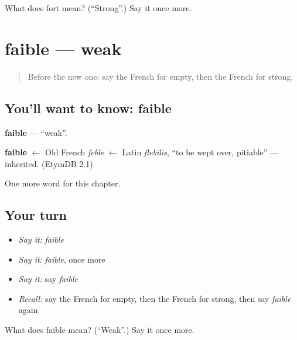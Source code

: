 \begin{tcolorbox}[breakable,colback=teal!4,colframe=teal!35!black,title={Before you move on}]
What does fort mean? (\textquotedblleft{}Strong\textquotedblright{}.) Say it once more.
\end{tcolorbox}
\section[faible]{faible — weak}

\label{lesson:FR-C91-faible}



\begin{quote}
Before the new one: say the French for empty, then the French for strong.
\end{quote}

\subsection*{You'll want to know: faible}
\textbf{faible} — \textquotedblleft{}weak\textquotedblright{}.

\begin{cousinweb}
\textbf{faible} $\leftarrow$ Old French \emph{feble} $\leftarrow$ Latin \emph{flebilis}, \textquotedblleft{}to be wept over, pitiable\textquotedblright{} — inherited. (EtymDB 2.1)
\end{cousinweb}

\begin{grammarlens}[title={What you've built}]
One more word for this chapter.
\end{grammarlens}

\subsection*{Your turn}
\begin{itemize}
\raggedright
  \item \emph{Say it:} \emph{faible}
  \item \emph{Say it:} \emph{faible}, once more
  \item \emph{Say it:} say \emph{faible}
  \item \emph{Recall:} say the French for empty, then the French for strong, then say \emph{faible} again
\end{itemize}

\begin{tcolorbox}[breakable,colback=teal!4,colframe=teal!35!black,title={Before you move on}]
What does faible mean? (\textquotedblleft{}Weak\textquotedblright{}.) Say it once more.
\end{tcolorbox}
